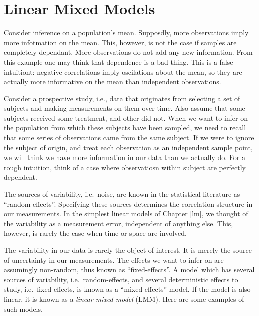 \documentclass[]{book}
\theoremstyle{definition}
\theoremstyle{definition}
\theoremstyle{definition}
\theoremstyle{remark}
\let\BeginKnitrBlock\begin \let\EndKnitrBlock\end
\begin{document}
\hypertarget{lme}{%
\chapter{Linear Mixed Models}\label{lme}}

\BeginKnitrBlock{example}[Dependent Samples on the Mean]
\protect\hypertarget{exm:dependence}{}{\label{exm:dependence} {} }Consider inference on a population's mean.
Supposdly, more observations imply more infotmation on the mean. This, however, is not the case if samples are completely dependant. More observations do not add any new information.
From this example one may think that dependence is a bad thing. This is a false intuitiont: negative correlations imply oscilations about the mean, so they are actually more informative on the mean than independent observations.
\EndKnitrBlock{example}

\BeginKnitrBlock{example}[Repeated Measures]
\protect\hypertarget{exm:repeated-measures}{}{\label{exm:repeated-measures} {} }Consider a prospective study, i.e., data that originates from selecting a set of subjects and making measurements on them over time.
Also assume that some subjects received some treatment, and other did not.
When we want to infer on the population from which these subjects have been sampled, we need to recall that some series of observations came from the same subject.
If we were to ignore the subject of origin, and treat each observation as an independent sample point, we will think we have more information in our data than we actually do.
For a rough intuition, think of a case where observatiosn within subject are perfectly dependent.
\EndKnitrBlock{example}

The sources of variability, i.e.~noise, are known in the statistical literature as ``random effects''.
Specifying these sources determines the correlation structure in our measurements.
In the simplest linear models of Chapter \ref{lm}, we thought of the variability as a measurement error, independent of anything else. This, however, is rarely the case when time or space are involved.

The variability in our data is rarely the object of interest.
It is merely the source of uncertainty in our measurements.
The effects we want to infer on are assumingly non-random, thus known as ``fixed-effects''.
A model which has several sources of variability, i.e.~random-effects, and several deterministic effects to study, i.e.~fixed-effects, is known as a ``mixed effects'' model.
If the model is also linear, it is known as a \emph{linear mixed model} (LMM).
Here are some examples of such models.
\end{document}
